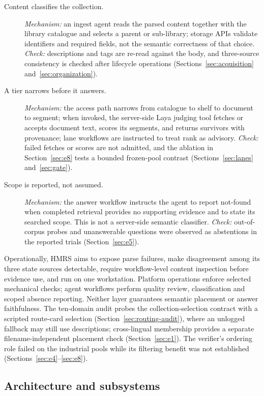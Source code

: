\begin{description}
\item[Content classifies the collection.] \emph{Mechanism:} an ingest agent
reads the parsed content together with the library catalogue and selects a
parent or sub-library; storage APIs validate identifiers and required fields,
not the semantic correctness of that choice. \emph{Check:} descriptions and
tags are re-read against the body, and three-source consistency is checked
after lifecycle operations (Sections~\ref{sec:acquisition}
and~\ref{sec:organization}).
\item[A tier narrows before it answers.] \emph{Mechanism:} the access path
narrows from catalogue to shelf to document to segment; when invoked, the
server-side Laya judging tool fetches or accepts document text, scores its
segments, and returns survivors with provenance; lane workflows are
instructed to treat rank as advisory. \emph{Check:} failed fetches or scores
are not admitted, and the ablation in Section~\ref{sec:e8} tests a bounded
frozen-pool contrast (Sections~\ref{sec:lanes} and~\ref{sec:gate}).
\item[Scope is reported, not assumed.] \emph{Mechanism:} the answer workflow
instructs the agent to report not-found when completed retrieval provides no
supporting evidence and to state its searched scope. This is not a
server-side semantic classifier. \emph{Check:} out-of-corpus probes and
unanswerable questions were observed as abstentions in the reported trials
(Section~\ref{sec:e5}).
\end{description}

Operationally, HMRS aims to expose parse failures, make disagreement among
its three state sources detectable, require workflow-level content inspection
before evidence use, and run on one workstation. Platform operations enforce
selected mechanical checks; agent workflows perform quality review,
classification and scoped absence reporting. Neither layer guarantees
semantic placement or answer faithfulness. The ten-domain audit probes the
collection-selection contract with a scripted route-card selection
(Section~\ref{sec:routing-audit}), where an unlogged fallback may still use
descriptions; cross-lingual membership provides a separate
filename-independent placement check (Section~\ref{sec:e1}). The verifier's
ordering role failed on the industrial pools while its filtering benefit was
not established (Sections~\ref{sec:e4}--\ref{sec:e8}).

\subsection{Architecture and subsystems}
\label{sec:architecture}

